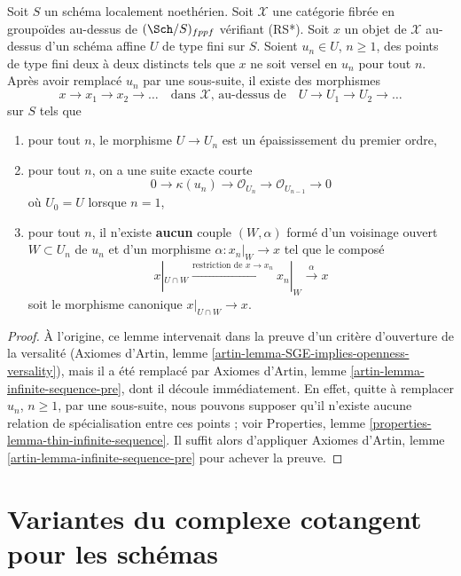 \begin{lemma}
\label{lemma-infinite-sequence}
Soit $S$ un schéma localement noethérien. Soit $\mathcal{X}$ une catégorie
fibrée en groupoïdes au-dessus de $(\Sch/S)_{fppf}$ vérifiant (RS*).
Soit $x$ un objet de
$\mathcal{X}$ au-dessus d'un schéma affine $U$ de type fini sur $S$.
Soient $u_n \in U$, $n \geq 1$, des points de type fini deux à deux distincts
tels que $x$ ne soit versel en $u_n$ pour tout $n$. Après avoir remplacé
$u_n$ par une sous-suite, il existe des morphismes
$$
x \to x_1 \to x_2 \to \ldots
\quad\text{dans }\mathcal{X}\text{, au-dessus de}\quad
U \to U_1 \to U_2 \to \ldots
$$
sur $S$ tels que
\begin{enumerate}
\item pour tout $n$, le morphisme $U \to U_n$ est un épaississement
du premier ordre,
\item pour tout $n$, on a une suite exacte courte
$$
0 \to \kappa(u_n) \to \mathcal{O}_{U_n} \to \mathcal{O}_{U_{n - 1}} \to 0
$$
où $U_0 = U$ lorsque $n = 1$,
\item pour tout $n$, il n'existe {\bf aucun} couple $(W, \alpha)$
formé d'un voisinage ouvert $W \subset U_n$ de $u_n$
et d'un morphisme $\alpha : x_n|_W \to x$
tel que le composé
$$
x|_{U \cap W} \xrightarrow{\text{restriction de }x \to x_n}
x_n|_W \xrightarrow{\alpha} x
$$
soit le morphisme canonique $x|_{U \cap W} \to x$.
\end{enumerate}
\end{lemma}

\begin{proof}
À l'origine, ce lemme intervenait dans la preuve d'un critère
d'ouverture de la versalité
(Axiomes d'Artin, lemme \ref{artin-lemma-SGE-implies-openness-versality}),
mais il a été remplacé par Axiomes d'Artin,
lemme \ref{artin-lemma-infinite-sequence-pre}, dont il découle immédiatement.
En effet, quitte à remplacer $u_n$, $n \geq 1$, par une sous-suite,
nous pouvons supposer qu'il n'existe aucune relation de spécialisation
entre ces points ; voir Properties,
lemme \ref{properties-lemma-thin-infinite-sequence}.
Il suffit alors d'appliquer Axiomes d'Artin,
lemme \ref{artin-lemma-infinite-sequence-pre} pour achever la preuve.
\end{proof}




\section{Variantes du complexe cotangent pour les schémas}
\label{section-cotangent-schemes-variant}

